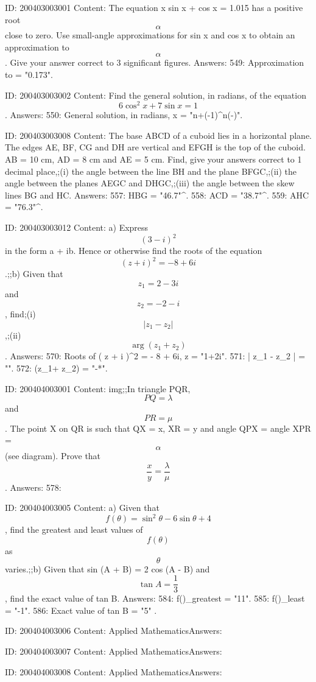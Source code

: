 \documentclass{article}
\begin{document}
ID: 200403003001
Content:
The equation x sin x + cos x = 1.015 has a positive root  $$\alpha $$ close to zero. Use small-angle approximations for sin x and cos x to obtain an approximation to  $$\alpha $$. Give your answer correct to 3 significant figures.  Answers:
549: Approximation to  \alpha  = "0.173".

ID: 200403003002
Content:
Find the general solution, in radians, of the equation  $$6\cos ^2 x + 7\sin x = 1$$. Answers:
550: General solution, in radians,  x = "n\pi +{{(-1)}^{n}}(-\pi)".

ID: 200403003008
Content:
The base ABCD of a cuboid lies in a horizontal plane. The edges AE, BF, CG and DH are vertical and EFGH is the top of the cuboid. AB = 10 cm, AD = 8 cm and AE = 5 cm. Find, give your answers correct to 1 decimal place,;(i) the angle between the line BH and the plane BFGC,;(ii) the angle between the planes AEGC and DHGC,;(iii) the angle between the skew lines BG and HC. Answers:
557: \angle HBG = "46.7"^{\circ}.
558: \angle ACD = "38.7"^{\circ}.
559: \angle AHC = "76.3"^{\circ}.

ID: 200403003012
Content:
a)  Express  $$(3 - i) ^2 $$ in the form a + ib. Hence or otherwise find the roots of the equation  $$( z + i )^2  =  - 8 + 6i$$.;;b) Given that  $$z_1  = 2 - 3i$$ and  $$z_2  =  - 2 - i$$, find;(i)  $$| z_1  - z_2  |$$,;(ii) $$\arg ( z_1  + z_2  )$$. Answers:
570: Roots of ( z + i )^2  =  - 8 + 6i, z = "1+2i".
571: | z_1  - z_2  | = "".
572: \arg(z_1+ z_2) = "-*\pi".

ID: 200404003001
Content:
img;;In triangle PQR,  $$PQ = \lambda $$ and  $$PR = \mu $$. The point X on QR is such that QX = x, XR = y and angle QPX = angle XPR =  $$\alpha $$ (see diagram). Prove that  $$\frac{x}{y} = \frac{\lambda}{\mu}$$. Answers:
578: 

ID: 200404003005
Content:
a) Given that  $$f( \theta  ) = \sin ^2 \theta  - 6\sin \theta  + 4$$, find the greatest and least values of  $$f( \theta  )$$ as  $$\theta $$ varies.;;b) Given that sin (A + B) = 2 cos (A - B) and  $$\tan A = \frac{1}{3}$$, find the exact value of tan B. Answers:
584: f(\theta)_{greatest} = "11".
585: f(\theta)_{least} = "-1".
586: Exact value of tan B = "5" .

ID: 200404003006
Content:
Applied MathematicsAnswers:

ID: 200404003007
Content:
Applied MathematicsAnswers:

ID: 200404003008
Content:
Applied MathematicsAnswers:
\end{document}
